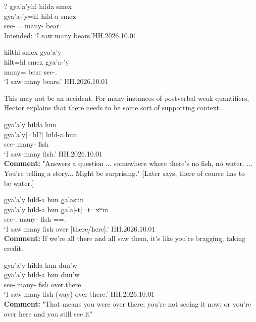 \documentclass{article}
\begin{document}
\begin{exe}
    \ex 
    \begin{xlist}
    \item    \glll ? gya'a'yhl hilda smex \\
    {} gya'a-'y=hl hild-a smex \\
    {} see-\Fsg{}.\Ii{}=\Cn{} many-\Attr{} bear\\
    Intended: `I saw many bears.'\hfill HH.2026.10.01
    \item \glll hilthl smex gya'a'y \\
    hilt=hl smex gya'a-'y \\
    many=\Cn{} bear see-\Fsg{}.\Ii{}\\
    `I saw many bears.' \hfill HH.2026.10.01
    \end{xlist}
\end{exe}

This may not be an accident. For many instances of postverbal weak quantifiers, Hector explains that there needs to be some sort of supporting context.

\begin{exe}
    \ex 
    \begin{xlist}
    \item   \glll
    gya'a'y hilda hun \\
    gya'a'y[=hl?] hild-a hun \\
    see-\Fsg.\Ii[=\Cn?] many-\Attr{} fish \\
    \glt `I saw many fish.' \hfill HH.2026.10.01 \\
    \textbf{Comment:} "Answers a question ... somewhere where there’s no fish, no water. ... You’re telling a story... Might be surprising." [Later says, there of course has to be water.]
    \item \glll 
    gya'a'y hild-a hun g̱a'asun \\
    gya'a'y hild-a hun  g̱a'a[-t]=t=xʷin \\
    see-\Fsg.\I{} many-\Attr{} fish \Loc[3.\Ii]=\Pn=\Dem.\Prox \\
    \glt `I saw many fish over [there/here].' \hfill HH.2026.10.01 \\
    \textbf{Comment:} If we're all there and all saw them, it's like you're bragging, taking credit. 
    \item \glll
    gya'a'y hilda hun duu'w \\
    gya'a'y hild-a hun  duu'w \\
    see-\Fsg.\Ii[=\Cn?] many-\Attr{} fish over.there \\
    \glt `I saw many fish (way) over there.'  \hfill HH.2026.10.01 \\
    \textbf{Comment:} "That means you were over there; you're not seeing it now; or you're over here and you still see it"
    \end{xlist}
\end{exe}
\end{document}
